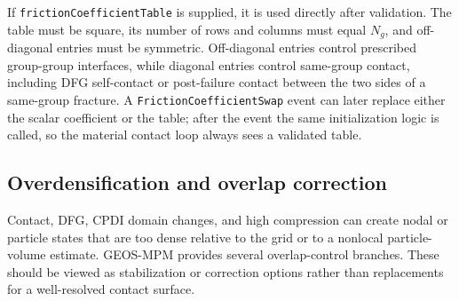 If \texttt{frictionCoefficientTable} is supplied, it is used directly after validation.  The table must be square, its number of rows and columns must equal $N_g$, and off-diagonal entries must be symmetric.  Off-diagonal entries control prescribed group-group interfaces, while diagonal entries control same-group contact, including DFG self-contact or post-failure contact between the two sides of a same-group fracture.  A \texttt{FrictionCoefficientSwap} event can later replace either the scalar coefficient or the table; after the event the same initialization logic is called, so the material contact loop always sees a validated table.

\subsection{Overdensification and overlap correction}
\label{subsec:overdensification-overlap-correction}

Contact, DFG, CPDI domain changes, and high compression can create nodal or particle states that are too dense relative to the grid or to a nonlocal particle-volume estimate.  GEOS-MPM provides several overlap-control branches.  These should be viewed as stabilization or correction options rather than replacements for a well-resolved contact surface.

